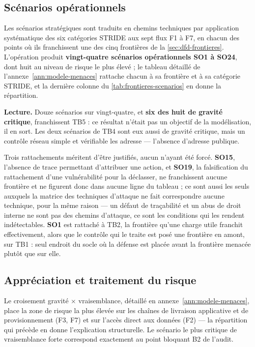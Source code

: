 \subsection{Scénarios opérationnels}

Les scénarios stratégiques sont traduits en chemins techniques par application systématique des
six catégories STRIDE aux sept flux F1 à F7, en chacun des points où ils franchissent une des cinq
frontières de la \cref{sec:dfd-frontieres}. L'opération produit \textbf{vingt-quatre
scénarios opérationnels SO1 à SO24}, dont huit au niveau de risque le plus élevé ; le tableau
détaillé de l'annexe~\ref{ann:modele-menaces} rattache chacun à sa frontière et à sa catégorie
STRIDE, et la dernière colonne du \cref{tab:frontieres-scenarios} en donne la répartition.

\textbf{Lecture.} Douze scénarios sur vingt-quatre, et \textbf{six des huit de gravité critique},
franchissent TB5 : ce résultat n'était pas un objectif de la modélisation, il en sort. Les deux
scénarios de TB4 sont eux aussi de gravité critique, mais un contrôle réseau simple et vérifiable
les adresse --- l'absence d'adresse publique.

Trois rattachements méritent d'être justifiés, aucun n'ayant été forcé. \textbf{SO15}, l'absence
de trace permettant d'attribuer une action, et \textbf{SO19}, la falsification du rattachement
d'une vulnérabilité pour la déclasser, ne franchissent aucune frontière et ne figurent donc dans
aucune ligne du tableau ; ce sont aussi les seuls auxquels la matrice des techniques d'attaque ne
fait correspondre aucune technique, pour la même raison --- un défaut de traçabilité et un abus de
droit interne ne sont pas des chemins d'attaque, ce sont les conditions qui les rendent
indétectables. \textbf{SO1} est rattaché à TB2, la frontière qu'une charge utile franchit
effectivement, alors que le contrôle qui le traite est posé une frontière en amont, sur TB1 : seul
endroit du socle où la défense est placée avant la frontière menacée plutôt que sur elle.

\subsection{Appréciation et traitement du risque}

Le croisement gravité $\times$ vraisemblance, détaillé en annexe~\ref{ann:modele-menaces}, place
la zone de risque la plus élevée sur les chaînes de livraison applicative et de provisionnement
(F3, F7) et sur l'accès direct aux données (F2) --- la répartition qui précède en donne
l'explication structurelle. Le scénario le plus critique de vraisemblance forte correspond
exactement au point bloquant B2 de l'audit.

